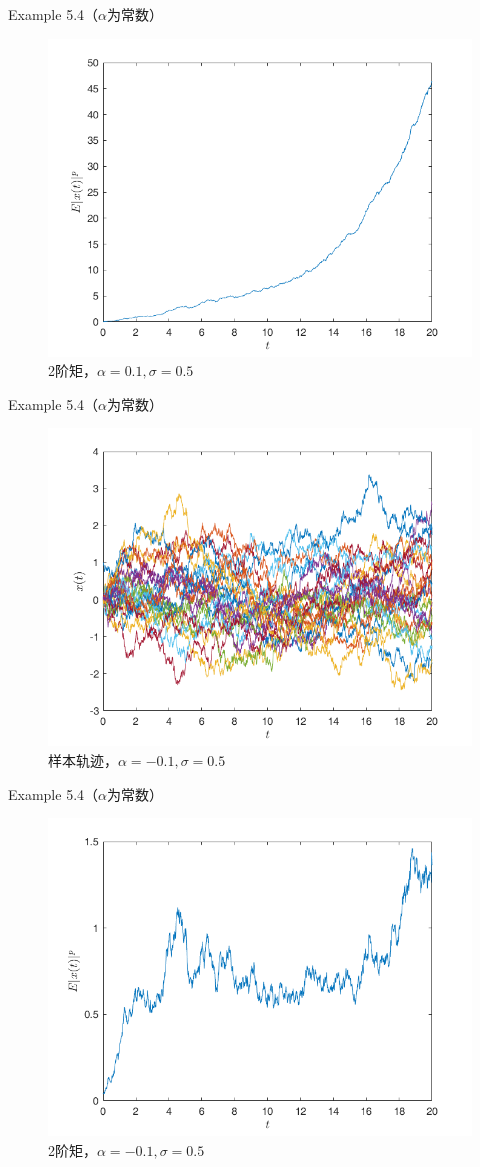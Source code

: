 \documentclass[10pt,aspectratio=43]{beamer}
\begin{document}
\begin{frame}{Example 5.4（$ \alpha $为常数）}
\begin{figure}
\centering
\includegraphics[width=0.7\linewidth]{../figures/2}
\caption{2阶矩，$ \alpha=0.1,\sigma=0.5 $}
\end{figure}
\end{frame}

\begin{frame}{Example 5.4（$ \alpha $为常数）}
\begin{figure}
\centering
\includegraphics[width=0.7\linewidth]{../figures/3}
\caption{样本轨迹，$ \alpha=-0.1,\sigma=0.5 $}
\end{figure}
\end{frame}

\begin{frame}{Example 5.4（$ \alpha $为常数）}
\begin{figure}
\centering
\includegraphics[width=0.7\linewidth]{../figures/4}
\caption{2阶矩，$ \alpha=-0.1,\sigma=0.5 $}
\end{figure}
\end{frame}
\end{document}
